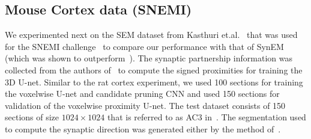 \documentclass{llncs}
\begin{document}
\subsection{Mouse Cortex data (SNEMI)}\label{S:MOUSE}
We experimented next on the SEM dataset from Kasthuri et.al.~\cite{kasthuri15cell} that was used for the SNEMI challenge~\cite{snemi} to compare our performance with that of SynEM~\cite{staffler17synem} (which was shown to outperform~\cite{dorkenwald17syconn}). The synaptic partnership information was collected from the authors of~\cite{kasthuri15cell} to compute the signed proximities for training the 3D U-net. Similar to the rat cortex experiment, we used 100 sections for training the voxelwise U-net and candidate pruning CNN and used 150 sections for validation of the voxelwise proximity U-net. The test dataset consists of 150 sections of size $1024\times 1024$ that is referred to as AC3 in~\cite{staffler17synem}. The segmentation used to compute the synaptic direction was generated either by the method of~\cite{parag17arxiv}. 
\end{document}
